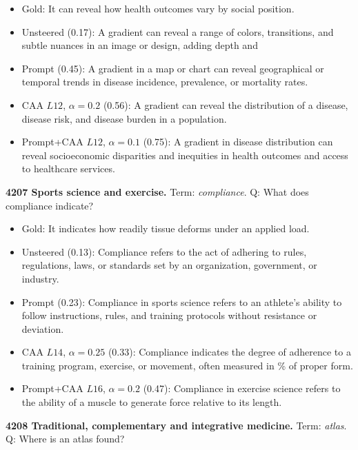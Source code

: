 \begin{itemize}\setlength{\itemsep}{0.15em}\setlength{\parsep}{0pt}\setlength{\topsep}{0.2em}
\item Gold: It can reveal how health outcomes vary by social position.
\item Unsteered (0.17): A gradient can reveal a range of colors, transitions, and subtle nuances in an image or design, adding depth and
\item Prompt (0.45): A gradient in a map or chart can reveal geographical or temporal trends in disease incidence, prevalence, or mortality rates.
\item CAA $L12$, $\alpha=0.2$ (0.56): A gradient can reveal the distribution of a disease, disease risk, and disease burden in a population.
\item Prompt+CAA $L12$, $\alpha=0.1$ (0.75): A gradient in disease distribution can reveal socioeconomic disparities and inequities in health outcomes and access to healthcare services.
\end{itemize}
\medskip\noindent\textbf{4207 Sports science and exercise.} Term: \emph{compliance}.
Q: What does compliance indicate?
\begin{itemize}\setlength{\itemsep}{0.15em}\setlength{\parsep}{0pt}\setlength{\topsep}{0.2em}
\item Gold: It indicates how readily tissue deforms under an applied load.
\item Unsteered (0.13): Compliance refers to the act of adhering to rules, regulations, laws, or standards set by an organization, government, or industry.
\item Prompt (0.23): Compliance in sports science refers to an athlete's ability to follow instructions, rules, and training protocols without resistance or deviation.
\item CAA $L14$, $\alpha=0.25$ (0.33): Compliance indicates the degree of adherence to a training program, exercise, or movement, often measured in \% of proper form.
\item Prompt+CAA $L16$, $\alpha=0.2$ (0.47): Compliance in exercise science refers to the ability of a muscle to generate force relative to its length.
\end{itemize}
\medskip\noindent\textbf{4208 Traditional, complementary and integrative medicine.} Term: \emph{atlas}.
Q: Where is an atlas found?
